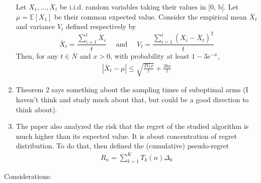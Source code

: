 \documentclass{article}
\begin{document}
\begin{enumerate}
    Let $X_1 , . . . , X_t$ be i.i.d. random variables taking their values in [0, b]. Let $\mu = \mathbb{E}[X_1]$ be their common expected value. Consider the empirical mean $\bar{X}_t$ and variance $V_t$ defined respectively by
    $$\overline{X}_{t}=\frac{\sum_{i=1}^{t} X_{i}}{t} \quad \text { and } \quad V_{t}=\frac{\sum_{i=1}^{t}\left(X_{i}-\overline{X}_{t}\right)^{2}}{t}$$
    Then, for any $t \in N$ and $x > 0$, with probability at least $1-3e^{-x}$,
    \begin{align}
        \label{tail bound for ucbv}
        \left|\overline{X}_{t}-\mu\right| \leq \sqrt{\frac{2 V_{t} x}{t}}+\frac{3 b x}{t}
    \end{align}
    
    \item Theorem 2 says something about the sampling times of suboptimal arms (I haven't think and study much about that, but could be a good direction to think about).
    
    \item The paper also analyzed the risk that the
regret of the studied algorithm is much higher than its expected value. It is about concentration of regret distribution. To do that, then defined the (cumulative) pseudo-regret
\begin{align}
    R_{n}=\sum_{k=1}^{K} T_{k}(n) \Delta_{k}
\end{align}
\end{enumerate}

Considerations:
\end{document}
